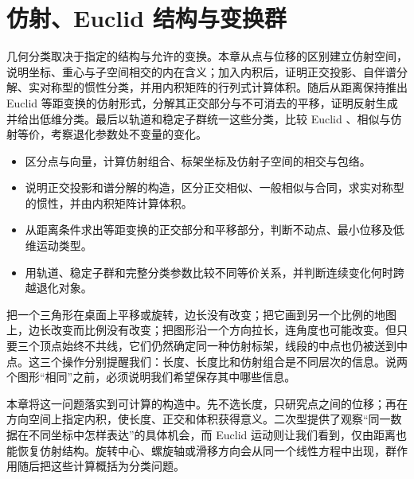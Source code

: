 
% 
% 

\chapter{仿射、Euclid 结构与变换群}
\label{g1:ch:01}

\begin{chapterabstract}
	几何分类取决于指定的结构与允许的变换。本章从点与位移的区别建立仿射空间，说明坐标、重心与子空间相交的内在含义；加入内积后，证明正交投影、自伴谱分解、实对称型的惯性分类，并用内积矩阵的行列式计算体积。随后从距离保持推出 Euclid 等距变换的仿射形式，分解其正交部分与不可消去的平移，证明反射生成并给出低维分类。最后以轨道和稳定子群统一这些分类，比较 Euclid 、相似与仿射等价，考察退化参数处不变量的变化。
\end{chapterabstract}

\begin{learninggoals}
	\begin{itemize}
		\item 区分点与向量，计算仿射组合、标架坐标及仿射子空间的相交与包络。
		\item 说明正交投影和谱分解的构造，区分正交相似、一般相似与合同，求实对称型的惯性，并由内积矩阵计算体积。
		\item 从距离条件求出等距变换的正交部分和平移部分，判断不动点、最小位移及低维运动类型。
		\item 用轨道、稳定子群和完整分类参数比较不同等价关系，并判断连续变化何时跨越退化对象。
	\end{itemize}
\end{learninggoals}

把一个三角形在桌面上平移或旋转，边长没有改变；把它画到另一个比例的地图上，边长改变而比例没有改变；把图形沿一个方向拉长，连角度也可能改变。但只要三个顶点始终不共线，它们仍然确定同一种仿射标架，线段的中点也仍被送到中点。这三个操作分别提醒我们：长度、长度比和仿射组合是不同层次的信息。说两个图形“相同”之前，必须说明我们希望保存其中哪些信息。

\ProseParagraphBreak

本章将这一问题落实到可计算的构造中。先不选长度，只研究点之间的位移；再在方向空间上指定内积，使长度、正交和体积获得意义。二次型提供了观察“同一数据在不同坐标中怎样表达”的具体机会，而 Euclid 运动则让我们看到，仅由距离也能恢复仿射结构。旋转中心、螺旋轴或滑移方向会从同一个线性方程中出现，群作用随后把这些计算概括为分类问题。

